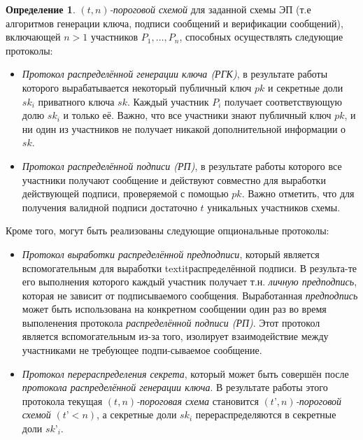 \documentclass[a4paper,12pt]{article}
\theoremstyle{definition}
\newtheorem{defn}{Определение}
\begin{document}
	\begin{defn}\label{def:Tscheme}
	\emph{$(t, n)$-пороговой схемой} для заданной схемы ЭП (т.е алгоритмов генерации ключа, подписи сообщений и верификации сообщений), включающей $n > 1$ участников $P_1, \dots, P_n$, способных осуществлять следующие протоколы:
	\begin{itemize}
		\item \label{def:Tkeygen} \emph{Протокол распределённой генерации ключа (РГК)}, в результате работы которого вырабатывается некоторый публичный ключ $pk$ и секретные доли $sk_i$ приватного ключа $sk$. Каждый участник $P_i$ получает соответствующую долю $sk_i$ и только её. Важно, что все участники знают публичный ключ $pk$, и ни один из участников не получает никакой дополнительной информации о $sk$.
		\item \label{def:Tsign} \emph{Протокол распределённой подписи (РП)}, в результате работы которого все участники получают сообщение и действуют совместно для выработки действующей подписи, проверяемой с помощью $pk$. Важно отметить, что для получения валидной подписи достаточно $t$ уникальных участников схемы.
	\end{itemize}

	Кроме того, могут быть реализованы следующие опциональные протоколы:

	\begin{itemize}
		\item \label{def:Tpredsign} \emph{Протокол выработки распределённой предподписи}, который является вспомогательным для выработки textit{распределённой подписи}. В результа-те его выполнения которого каждый участник получает т.н. \emph{личную предподпись}, которая не зависит от подписываемого сообщения. Выработанная \emph{предподпись} может быть использована на конкретном сообщении один раз во время выполенения протокола \emph{распределённой подписи (РП)}. Этот протокол является вспомогательным из-за того, изолирует взаимодействие между участниками не требующее подпи-сываемое сообщение.
		\item \label{def:Tredisp} \emph{Протокол перераспределения секрета}, который может быть совершён после \emph{протокола распределённой генерации ключа}. В результате работы этого протокола текущая \emph{$(t, n)$-пороговая схема} становится \emph{$(t’, n)$-пороговой схемой} $\left(t’ < n\right)$, а секретные доли $sk_i$ перераспределяются в секретные доли $sk’_i$.	
	\end{itemize}
	\end{defn}
	
\end{document}
